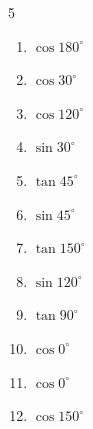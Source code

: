 \begin{multicols}{5}
\begin{enumerate}

  \item $\displaystyle \cos{180^\circ}$

        \phantom{$\displaystyle =-1$}

  \item $\displaystyle \cos{30^\circ}$


  \item $\displaystyle \cos{120^\circ}$


  \item $\displaystyle \sin{30^\circ}$


  \item $\displaystyle \tan{45^\circ}$

        \phantom{$\displaystyle =1$}

  \item $\displaystyle \sin{45^\circ}$


  \item $\displaystyle \tan{150^\circ}$


  \item $\displaystyle \sin{120^\circ}$


  \item $\displaystyle \tan{90^\circ}$

        \phantom{$\displaystyle なし$}

\columnbreak %

  \item $\displaystyle \cos{0^\circ}$

        \phantom{$\displaystyle =1$}

  \item $\displaystyle \cos{0^\circ}$

        \phantom{$\displaystyle =1$}

  \item $\displaystyle \cos{150^\circ}$



\end{enumerate}
\end{multicols}
